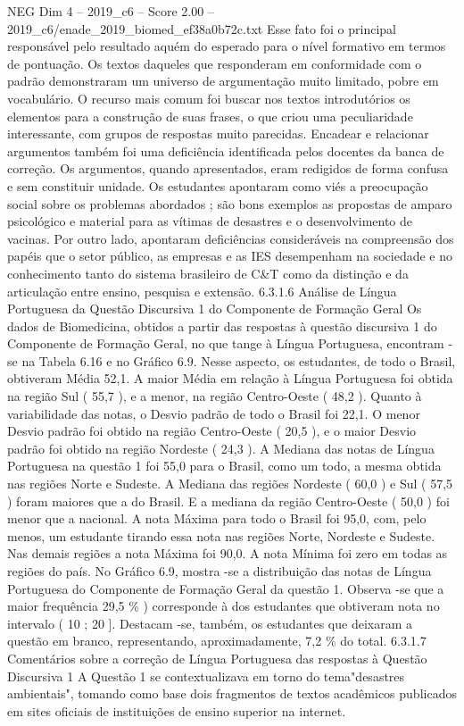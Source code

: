 \begin{textsample}{NEG Dim 4 – 2019\_c6 – Score 2.00 – 2019\_c6/enade\_2019\_biomed\_ef38a0b72c.txt}
Esse fato foi o principal responsável pelo resultado aquém do esperado para o nível formativo em termos de pontuação.
Os textos daqueles que responderam em conformidade com o padrão demonstraram um universo de argumentação muito limitado, pobre em vocabulário.
O recurso mais comum foi buscar nos textos introdutórios os elementos para a construção de suas frases, o que criou uma peculiaridade interessante, com grupos de respostas muito parecidas.
Encadear e relacionar argumentos também foi uma deficiência identificada pelos docentes da banca de correção.
Os argumentos, quando apresentados, eram redigidos de forma confusa e sem constituir unidade.
Os estudantes apontaram como viés a preocupação social sobre os problemas abordados ; são bons exemplos as propostas de amparo psicológico e material para as vítimas de desastres e o desenvolvimento de vacinas.
Por outro lado, apontaram deficiências consideráveis na compreensão dos papéis que o setor público, as empresas e as IES desempenham na sociedade e no conhecimento tanto do sistema brasileiro de C\&T como da distinção e da articulação entre ensino, pesquisa e extensão. 6.3.1.6 Análise de Língua Portuguesa da Questão Discursiva 1 do Componente de Formação Geral Os dados de Biomedicina, obtidos a partir das respostas à questão discursiva 1 do Componente de Formação Geral, no que tange à Língua Portuguesa, encontram -se na Tabela 6.16 e no Gráfico 6.9.
Nesse aspecto, os estudantes, de todo o Brasil, obtiveram Média 52,1.
A maior Média em relação à Língua Portuguesa foi obtida na região Sul ( 55,7 ), e a menor, na região Centro-Oeste ( 48,2 ).
Quanto à variabilidade das notas, o Desvio padrão de todo o Brasil foi 22,1.
O menor Desvio padrão foi obtido na região Centro-Oeste ( 20,5 ), e o maior Desvio padrão foi obtido na região Nordeste ( 24,3 ).
A Mediana das notas de Língua Portuguesa na questão 1 foi 55,0 para o Brasil, como um todo, a mesma obtida nas regiões Norte e Sudeste.
A Mediana das regiões Nordeste ( 60,0 ) e Sul ( 57,5 ) foram maiores que a do Brasil.
E a mediana da região Centro-Oeste ( 50,0 ) foi menor que a nacional.
A nota Máxima para todo o Brasil foi 95,0, com, pelo menos, um estudante tirando essa nota nas regiões Norte, Nordeste e Sudeste.
Nas demais regiões a nota Máxima foi 90,0.
A nota Mínima foi zero em todas as regiões do país.
No Gráfico 6.9, mostra -se a distribuição das notas de Língua Portuguesa do Componente de Formação Geral da questão 1.
Observa -se que a maior frequência 29,5 \% ) corresponde à dos estudantes que obtiveram nota no intervalo ( 10 ; 20 ].
Destacam -se, também, os estudantes que deixaram a questão em branco, representando, aproximadamente, 7,2 \% do total. 6.3.1.7 Comentários sobre a correção de Língua Portuguesa das respostas à Questão Discursiva 1 A Questão 1 se contextualizava em torno do tema"desastres ambientais", tomando como base dois fragmentos de textos acadêmicos publicados em sites oficiais de instituições de ensino superior na internet.

\end{textsample}
